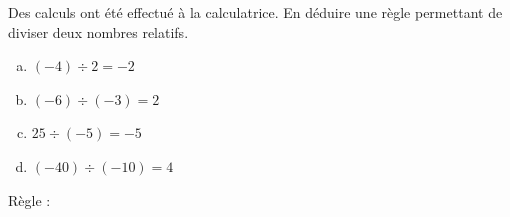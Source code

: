 \documentclass[../main.tex]{subfiles}
\begin{document}
Des calculs ont été effectué à la calculatrice. En déduire une règle
permettant de diviser deux nombres relatifs.
\begin{enumerate}[a), font=\bfseries]
\item$(-4)\div2=-2$
\item$(-6)\div(-3)=2$
\item$25\div(-5)=-5$
\item$(-40)\div(-10)=4$
\end{enumerate}
\begin{simplebox}
Règle :
\vspace{10cm}
\end{simplebox}
\end{document}
